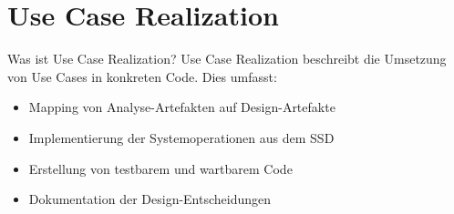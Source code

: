 \section{Use Case Realization}

\begin{concept}{Was ist Use Case Realization?}
Use Case Realization beschreibt die Umsetzung von Use Cases in konkreten Code. Dies umfasst:
\begin{itemize}
    \item Mapping von Analyse-Artefakten auf Design-Artefakte
    \item Implementierung der Systemoperationen aus dem SSD
    \item Erstellung von testbarem und wartbarem Code
    \item Dokumentation der Design-Entscheidungen
\end{itemize}
\end{concept}

